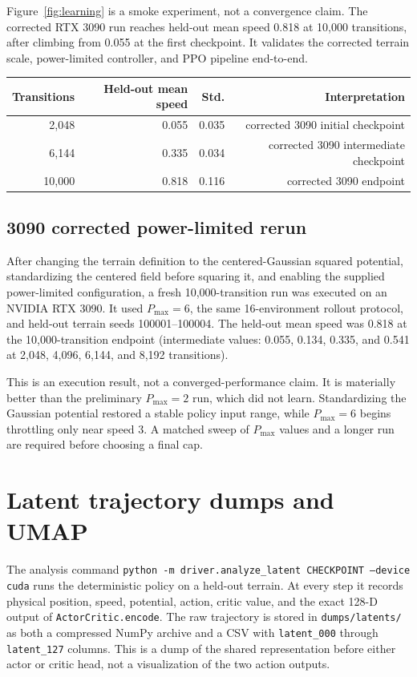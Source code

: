 \documentclass[10pt]{article}
\newcommand{\code}[1]{\texttt{#1}}
\begin{document}
Figure~\ref{fig:learning} is a smoke experiment, not a convergence claim. The
corrected RTX 3090 run reaches held-out mean speed 0.818 at 10,000 transitions,
after climbing from 0.055 at the first checkpoint. It validates the corrected
terrain scale, power-limited controller, and PPO pipeline end-to-end.

\begin{center}
\begin{tabular}{rrrr}
\toprule
\textbf{Transitions} & \textbf{Held-out mean speed} & \textbf{Std.} & \textbf{Interpretation}\\
\midrule
2,048 & 0.055 & 0.035 & corrected 3090 initial checkpoint\\
6,144 & 0.335 & 0.034 & corrected 3090 intermediate checkpoint\\
10,000 & 0.818 & 0.116 & corrected 3090 endpoint\\
\bottomrule
\end{tabular}
\end{center}

\subsection{3090 corrected power-limited rerun}
After changing the terrain definition to the centered-Gaussian squared potential,
standardizing the centered field before squaring it, and enabling the supplied
power-limited configuration, a fresh 10,000-transition run was executed on an
NVIDIA RTX 3090. It used $P_{\max}=6$, the same 16-environment
rollout protocol, and held-out terrain seeds 100001--100004. The held-out mean
speed was 0.818 at the 10,000-transition endpoint (intermediate values: 0.055,
0.134, 0.335, and 0.541 at 2,048, 4,096, 6,144, and 8,192 transitions).

This is an execution result, not a converged-performance claim. It is materially
better than the preliminary $P_{\max}=2$ run, which did not learn. Standardizing
the Gaussian potential restored a stable policy input range, while $P_{\max}=6$
begins throttling only near speed 3. A matched sweep of $P_{\max}$ values and a
longer run are required before choosing a final cap.

\section{Latent trajectory dumps and UMAP}
The analysis command \code{python -m driver.analyze\_latent CHECKPOINT --device cuda}
runs the deterministic policy on a held-out terrain. At every step it records
physical position, speed, potential, action, critic value, and the exact
128-D output of \code{ActorCritic.encode}. The raw trajectory is stored in
\code{dumps/latents/} as both a compressed NumPy archive and a CSV with
\code{latent\_000} through \code{latent\_127} columns. This is a dump of the
shared representation before either actor or critic head, not a visualization
of the two action outputs.
\end{document}

